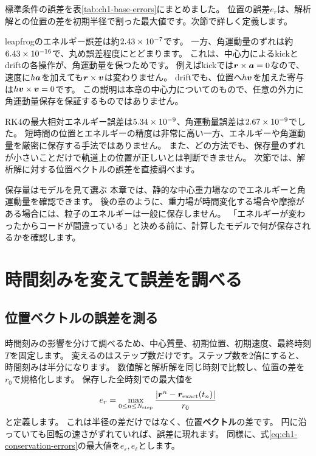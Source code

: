 標準条件の誤差を表\ref{tab:ch1-base-errors}にまとめました。
位置の誤差$e_r$は、解析解との位置の差を初期半径で割った最大値です。次節で詳しく定義します。
\begin{table}[!htbp]
\centering
\caption{同じ1周期・200ステップでの比較。$e_r$は最大位置誤差、$e_\varepsilon$と$e_\ell$は保存量の最大相対誤差です。
本章の実行結果であり、末尾の桁は実行環境で多少変わります。}
\label{tab:ch1-base-errors}
\small

\end{table}

leapfrogのエネルギー誤差は約$2.43\times 10^{-7}$です。
一方、角運動量のずれは約$6.43\times 10^{-16}$で、丸め誤差程度にとどまります。
これは、中心力によるkickとdriftの各操作が、角運動量を保つためです。
例えばkickでは$\boldsymbol r\times\boldsymbol a=0$なので、速度に$h\boldsymbol a$を加えても$\boldsymbol r\times\boldsymbol v$は変わりません。
driftでも、位置へ$h\boldsymbol v$を加えた寄与は$h\boldsymbol v\times\boldsymbol v=0$です。
この説明は本章の中心力についてのもので、任意の外力に角運動量保存を保証するものではありません。

RK4の最大相対エネルギー誤差は$5.34\times 10^{-9}$、角運動量誤差は$2.67\times 10^{-9}$でした。
短時間の位置とエネルギーの精度は非常に高い一方、エネルギーや角運動量を厳密に保存する手法ではありません。\cite{sugiura2009}
また、どの方法でも、保存量のずれが小さいことだけで軌道上の位置が正しいとは判断できません。
次節では、解析解に対する位置ベクトルの誤差を直接調べます。

\begin{failbox}{保存量はモデルを見て選ぶ}
本章では、静的な中心重力場なのでエネルギーと角運動量を確認できます。
後の章のように、重力場が時間変化する場合や摩擦がある場合には、粒子のエネルギーは一般に保存しません。
「エネルギーが変わったからコードが間違っている」と決める前に、計算したモデルで何が保存されるかを確認します。
\end{failbox}

\section{時間刻みを変えて誤差を調べる}
\label{sec:ch1-convergence}

\subsection{位置ベクトルの誤差を測る}

時間刻みの影響を分けて調べるため、中心質量、初期位置、初期速度、最終時刻$T$を固定します。
変えるのはステップ数だけです。ステップ数を2倍にすると、時間刻みは半分になります。
数値解と解析解を同じ時刻で比較し、位置の差を$r_0$で規格化します。
保存した全時刻での最大値を
\begin{equation}
e_r=\max_{0\le n\le N_{\rm step}}
\frac{|\boldsymbol r^n-\boldsymbol r_{\rm exact}(t_n)|}{r_0}
\label{eq:ch1-position-error}
\end{equation}
と定義します。
これは半径の差だけではなく、位置\textbf{ベクトル}の差です。
円に沿っていても回転の速さがずれていれば、誤差に現れます。
同様に、式\eqref{eq:ch1-conservation-errors}の最大値を$e_\varepsilon,e_\ell$とします。

